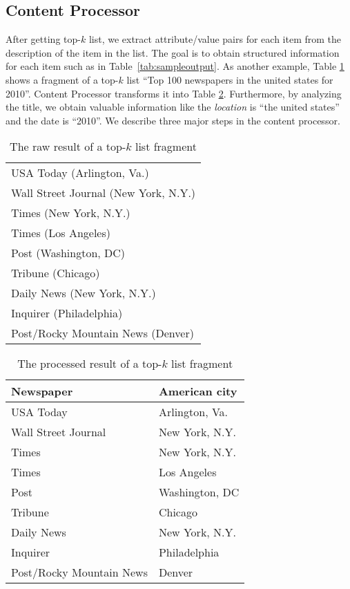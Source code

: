 \subsection{Content Processor}

After getting top-$k$ list, we extract attribute/value pairs for each
item from the description of the item in the list. The goal is to
obtain structured information for each item such as in
Table~\ref{tab:sampleoutput}.  As another example, Table
\ref{tab:rawList} shows a fragment of a top-$k$ list ``Top 100
newspapers in the united states for 2010''.  Content Processor
transforms it into Table \ref{tab:processedList}.  Furthermore,
by analyzing the title, we obtain valuable information like
the \emph{location} is ``the united states'' and
the date is ``2010''. We describe three major steps in the
content processor.

\begin{table}[th]
\centering
\caption{The raw result of a top-$k$ list fragment\cite{top100Newspapers}}
\begin{tabular}{|l|}
\hline
USA Today (Arlington, Va.)\\
Wall Street Journal (New York, N.Y.)\\
Times (New York, N.Y.)\\
Times (Los Angeles)\\
Post (Washington, DC)\\
Tribune (Chicago)\\
Daily News (New York, N.Y.)\\
Inquirer (Philadelphia)\\
Post/Rocky Mountain News (Denver)\\
\hline
\end{tabular}
\label{tab:rawList}
\end{table}

\begin{table}[th]
\centering
\caption{The processed result of a top-$k$ list fragment\cite{top100Newspapers}}
\begin{tabular}{|l|l|}
\hline
\textbf{Newspaper} & \textbf{American city}\\ \hline
USA Today &Arlington, Va.\\
Wall Street Journal &New York, N.Y.\\
Times &New York, N.Y.\\
Times &Los Angeles\\
Post &Washington, DC\\
Tribune &Chicago\\
Daily News &New York, N.Y.\\
Inquirer &Philadelphia\\
Post/Rocky Mountain News &Denver\\
\hline
\end{tabular}

\label{tab:processedList}
\end{table}


